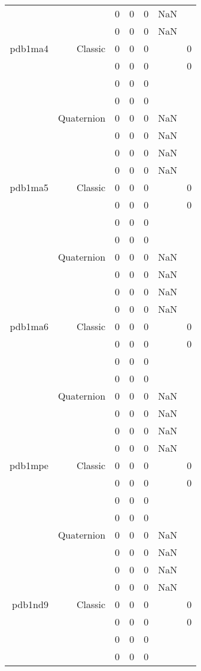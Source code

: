 \begin{xltabular}{\textwidth}{r|rcccSc}
& & 0 & 0 & 0 & NaN & \\
& & 0 & 0 & 0 & NaN & \\ \addlinespace
pdb1ma4 & Classic & 0 & 0 & 0 & & 0 \\
& & 0 & 0 & 0 & & 0 \\
& & 0 & 0 & 0 & & \\
& & 0 & 0 & 0 & & \\
& Quaternion & 0 & 0 & 0 & NaN & \\
& & 0 & 0 & 0 & NaN & \\
& & 0 & 0 & 0 & NaN & \\
& & 0 & 0 & 0 & NaN & \\ \addlinespace
pdb1ma5 & Classic & 0 & 0 & 0 & & 0 \\
& & 0 & 0 & 0 & & 0 \\
& & 0 & 0 & 0 & & \\
& & 0 & 0 & 0 & & \\
& Quaternion & 0 & 0 & 0 & NaN & \\
& & 0 & 0 & 0 & NaN & \\
& & 0 & 0 & 0 & NaN & \\
& & 0 & 0 & 0 & NaN & \\ \addlinespace
pdb1ma6 & Classic & 0 & 0 & 0 & & 0 \\
& & 0 & 0 & 0 & & 0 \\
& & 0 & 0 & 0 & & \\
& & 0 & 0 & 0 & & \\
& Quaternion & 0 & 0 & 0 & NaN & \\
& & 0 & 0 & 0 & NaN & \\
& & 0 & 0 & 0 & NaN & \\
& & 0 & 0 & 0 & NaN & \\ \addlinespace
pdb1mpe & Classic & 0 & 0 & 0 & & 0 \\
& & 0 & 0 & 0 & & 0 \\
& & 0 & 0 & 0 & & \\
& & 0 & 0 & 0 & & \\
& Quaternion & 0 & 0 & 0 & NaN & \\
& & 0 & 0 & 0 & NaN & \\
& & 0 & 0 & 0 & NaN & \\
& & 0 & 0 & 0 & NaN & \\ \addlinespace
pdb1nd9 & Classic & 0 & 0 & 0 & & 0 \\
& & 0 & 0 & 0 & & 0 \\
& & 0 & 0 & 0 & & \\
& & 0 & 0 & 0 & & \\

\end{xltabular}
